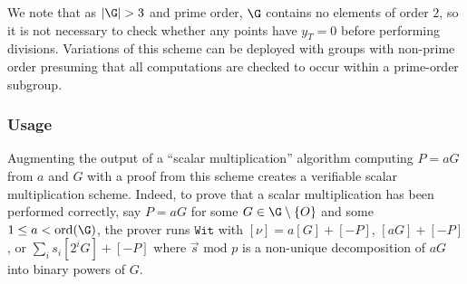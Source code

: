 \documentclass[11pt,letterpaper]{article}
\theoremstyle{definition}
\newcommand{\6}{\mathbf}
\newcommand{\7}{\mathcal}
\begin{document}

We note that as $\left|\G\right| > 3$ and prime order, $\G$ contains no elements of order $2$, so it is not necessary to check whether any points have $y_T = 0$ before performing divisions. Variations of this scheme can be deployed with groups with non-prime order presuming that all computations are checked to occur within a prime-order subgroup. 

\subsubsection{Usage}
Augmenting the output of a ``scalar multiplication'' algorithm computing $P=aG$ from $a$ and $G$ with a proof from this scheme creates a verifiable scalar multiplication scheme. Indeed, to prove that a scalar multiplication has been performed correctly, say $P = aG$ for some $G \in \G \setminus\left\{O\right\}$ and some $1 \leq a < \text{ord}(\G)$, the prover runs $\texttt{Wit}$ with $[\nu] = a[G] + [-P]$, $[aG] + [-P]$, or $\sum_i s_i [2^i G] + [-P]$ where $\vec{s} \text{ mod }p$ is a non-unique decomposition of $aG$ into binary powers of $G$.
\end{document}
